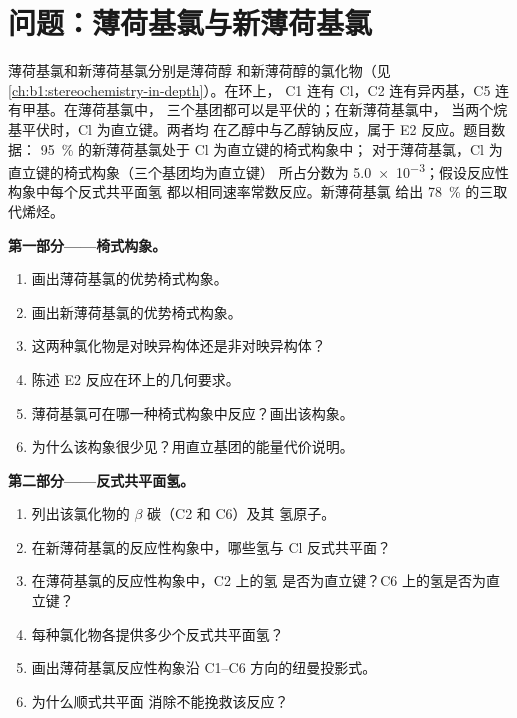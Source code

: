 \section{问题：薄荷基氯与新薄荷基氯}

\begin{problem}
\label{pb:b1:elimination:1}
薄荷基氯和新薄荷基氯分别是薄荷醇
和新薄荷醇的氯化物（见\cref{ch:b1:stereochemistry-in-depth}）。在环上，
C1 连有 Cl，C2 连有异丙基，C5 连有甲基。在薄荷基氯中，
三个基团都可以是平伏的；在新薄荷基氯中，
当两个烷基平伏时，Cl 为直立键。两者均
在乙醇中与乙醇钠反应，属于 E2 反应。题目数据：
\qty{95}{\percent} 的新薄荷基氯处于 Cl 为直立键的椅式构象中；
对于薄荷基氯，Cl 为直立键的椅式构象（三个基团均为直立键）
所占分数为 \num{5.0e-3}；假设反应性构象中每个反式共平面氢
都以相同速率常数反应。新薄荷基氯
给出 \qty{78}{\percent} 的三取代烯烃。

\medskip
\noindent\textbf{第一部分——椅式构象。}
\begin{enumerate}
  \item 画出薄荷基氯的优势椅式构象。
  \item 画出新薄荷基氯的优势椅式构象。
  \item 这两种氯化物是对映异构体还是非对映异构体？
  \item 陈述 E2 反应在环上的几何要求。
  \item 薄荷基氯可在哪一种椅式构象中反应？画出该构象。
  \item 为什么该构象很少见？用直立基团的能量代价说明。
\end{enumerate}

\medskip
\noindent\textbf{第二部分——反式共平面氢。}
\begin{enumerate}[resume]
  \item 列出该氯化物的 $\beta$ 碳（C2 和 C6）及其
        氢原子。
  \item 在新薄荷基氯的反应性构象中，哪些氢与 Cl
        反式共平面？
  \item 在薄荷基氯的反应性构象中，C2 上的氢
        是否为直立键？C6 上的氢是否为直立键？
  \item 每种氯化物各提供多少个反式共平面氢？
  \item 画出薄荷基氯反应性构象沿 C1--C6
        方向的纽曼投影式。
  \item 为什么顺式共平面
        消除不能挽救该反应？
\end{enumerate}


\end{problem}
